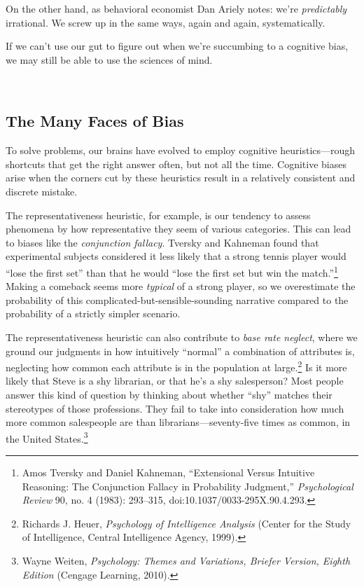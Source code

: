 \documentclass[letterpaper]{book}
\newcommand{\comment}[1]{
}
\begin{document}
{
 On the other hand, as behavioral economist Dan Ariely notes:
we're \textit{predictably} irrational. We screw up in
the same ways, again and again, systematically.}

{
 If we can't use our gut to figure out when
we're succumbing to a cognitive bias, we may still be
able to use the sciences of mind.}

{
 ~}

\subsection{The Many Faces of Bias}

{
 To solve problems, our brains have evolved to employ cognitive
heuristics---rough shortcuts that get the right answer often, but not
all the time. Cognitive biases arise when the corners cut by these
heuristics result in a relatively consistent and discrete mistake.}

{
 The representativeness heuristic, for example, is our tendency to
assess phenomena by how representative they seem of various categories.
This can lead to biases like the \textit{conjunction fallacy}. Tversky
and Kahneman found that experimental subjects considered it less likely
that a strong tennis player would ``lose the first
set'' than that he would ``lose the
first set but win the match.''\footnote{Amos Tversky and Daniel Kahneman,
``Extensional Versus Intuitive Reasoning: The
Conjunction Fallacy in Probability Judgment,''
\textit{Psychological Review} 90, no. 4 (1983): 293--315,
doi:10.1037/0033-295X.90.4.293.\comment{7}}
Making a comeback seems more \textit{typical} of a strong player, so we
overestimate the probability of this complicated-but-sensible-sounding
narrative compared to the probability of a strictly simpler scenario.}

{
 The representativeness heuristic can also contribute to
\textit{base rate neglect}, where we ground our judgments in how
intuitively ``normal'' a combination
of attributes is, neglecting how common each attribute is in the
population at large.\footnote{Richards J. Heuer, \textit{Psychology of Intelligence Analysis}
(Center for the Study of Intelligence, Central Intelligence Agency,
1999).\comment{8}} Is it more likely that Steve is
a shy librarian, or that he's a shy salesperson? Most
people answer this kind of question by thinking about whether
``shy'' matches their stereotypes of
those professions. They fail to take into consideration how much more
common salespeople are than librarians---seventy-five times as common,
in the United States.\footnote{Wayne Weiten, \textit{Psychology: Themes and Variations,
Briefer Version, Eighth Edition} (Cengage Learning, 2010).\comment{9}}}
\end{document}
